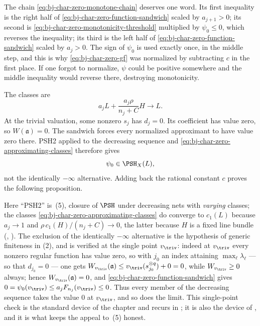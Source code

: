 The chain \eqref{eq:bj-char-zero-monotone-chain} deserves one word.  Its
first inequality is the right half of
\eqref{eq:bj-char-zero-function-sandwich} scaled by $a_{j+1}>0$; its
second is \eqref{eq:bj-char-zero-monotonicity-threshold} multiplied by
$\psi_0\le0$, which reverses the inequality; its third is the left half of
\eqref{eq:bj-char-zero-function-sandwich} scaled by $a_j>0$.  The sign of
$\psi_0$ is used exactly once, in the middle step, and this is why
\eqref{eq:bj-char-zero-gf} was normalized by subtracting $c$ in the first
place.  If one forgot to normalize, $\psi$ could be positive somewhere and
the middle inequality would reverse there, destroying monotonicity.

The classes are
\[
             a_jL+\frac{a_j\rho}{n_j+C}H
                         \longrightarrow L.
\tag{44.29}\label{eq:bj-char-zero-approximating-classes}
\]
At the trivial valuation, some nonzero $s_j$ has $d_j=0$.
Its coefficient has value zero, so $W(\mathfrak a)=0$.
The sandwich forces every normalized approximant to have value zero there.
PSH2 applied to the decreasing sequence and
\eqref{eq:bj-char-zero-approximating-classes} therefore gives
\[
                         \psi_0\in\PSH_X(L),
\]
not the identically $-\infty$ alternative.
Adding back the rational constant $c$ proves the following proposition.

Here ``PSH2'' is \,(5), closure of $\PSH$ under
decreasing nets with \emph{varying} classes; the classes
\eqref{eq:bj-char-zero-approximating-classes} do converge to $c_1(L)$
because $a_j\to1$ and $\rho\,c_1(H)/(n_j+C)\to0$, the latter because
$H$ is a fixed line bundle (,
).  The exclusion of the identically
$-\infty$ alternative is the hypothesis of generic finiteness in
(2), and is verified at the single point $v_\triv$:
indeed at $v_\triv$ every nonzero regular function has value zero, so with
$j_0$ an index attaining $\max_\ell\lambda_\ell$ --- so that
$d_{j_0}=0$ --- one gets $W_{v_\triv}(\mathfrak a)\le
v_\triv(s_{j_0}^{\otimes q})+0=0$, while $W_{v_\triv}\ge0$ always; hence
$W_{v_\triv}(\mathfrak a)=0$, and
\eqref{eq:bj-char-zero-function-sandwich} gives
$0=\psi_0(v_\triv)\le a_jF_{n_j}(v_\triv)\le0$.  Thus every member of the
decreasing sequence takes the value $0$ at $v_\triv$, and so does the
limit.  This single-point check is the standard device of the chapter and
recurs in ; it is also the
device of , and it is what keeps the
appeal to \,(5) honest.

